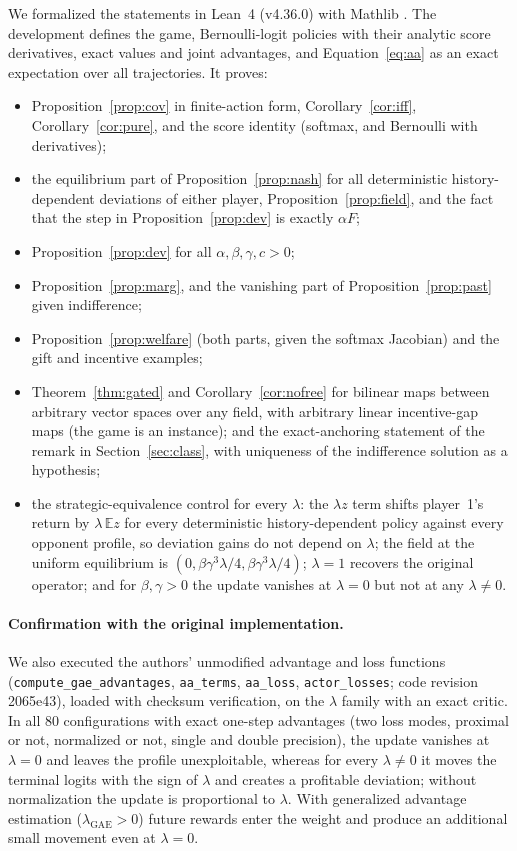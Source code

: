 \documentclass[11pt]{article}
\theoremstyle{remark}
\newcommand{\E}{\mathbb{E}}
\begin{document}
We formalized the statements in Lean~4 (v4.36.0) \citep{demoura2021lean4} with Mathlib \citep{mathlib2020}. The development defines the game, Bernoulli-logit policies with their analytic score derivatives, exact values and joint advantages, and Equation~\eqref{eq:aa} as an exact expectation over all trajectories. It proves:
\begin{itemize}
\item Proposition~\ref{prop:cov} in finite-action form, Corollary~\ref{cor:iff}, Corollary~\ref{cor:pure}, and the score identity (softmax, and Bernoulli with derivatives);
\item the equilibrium part of Proposition~\ref{prop:nash} for all deterministic history-dependent deviations of either player, Proposition~\ref{prop:field}, and the fact that the step in Proposition~\ref{prop:dev} is exactly $\alpha F$;
\item Proposition~\ref{prop:dev} for all $\alpha,\beta,\gamma,c>0$;
\item Proposition~\ref{prop:marg}, and the vanishing part of Proposition~\ref{prop:past} given indifference;
\item Proposition~\ref{prop:welfare} (both parts, given the softmax Jacobian) and the gift and incentive examples;
\item Theorem~\ref{thm:gated} and Corollary~\ref{cor:nofree} for bilinear maps between arbitrary vector spaces over any field, with arbitrary linear incentive-gap maps (the game is an instance); and the exact-anchoring statement of the remark in Section~\ref{sec:class}, with uniqueness of the indifference solution as a hypothesis;
\item the strategic-equivalence control for every $\lambda$: the $\lambda z$ term shifts player~1's return by $\lambda\,\E z$ for every deterministic history-dependent policy against every opponent profile, so deviation gains do not depend on $\lambda$; the field at the uniform equilibrium is $(0,\beta\gamma^3\lambda/4,\beta\gamma^3\lambda/4)$; $\lambda=1$ recovers the original operator; and for $\beta,\gamma>0$ the update vanishes at $\lambda=0$ but not at any $\lambda\neq0$.
\end{itemize}
\paragraph{Confirmation with the original implementation.} We also executed the authors' unmodified advantage and loss functions (\texttt{compute\_gae\_advantages}, \texttt{aa\_terms}, \texttt{aa\_loss}, \texttt{actor\_losses}; code revision 2065e43), loaded with checksum verification, on the $\lambda$ family with an exact critic. In all 80 configurations with exact one-step advantages (two loss modes, proximal or not, normalized or not, single and double precision), the update vanishes at $\lambda=0$ and leaves the profile unexploitable, whereas for every $\lambda\neq0$ it moves the terminal logits with the sign of $\lambda$ and creates a profitable deviation; without normalization the update is proportional to $\lambda$. With generalized advantage estimation ($\lambda_{\mathrm{GAE}}>0$) future rewards enter the weight and produce an additional small movement even at $\lambda=0$.
\end{document}
